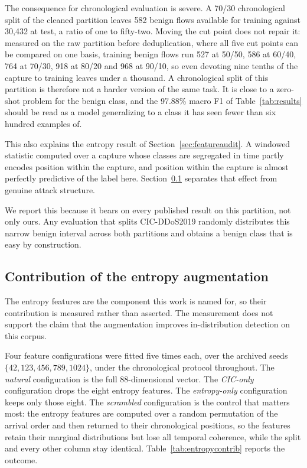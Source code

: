 \documentclass{ieeeaccess}
\begin{document}
The consequence for chronological evaluation is severe. A 70/30 chronological
split of the cleaned partition leaves 582 benign flows available for training
against 30,432 at test, a ratio of one to fifty-two. Moving the cut point does
not repair it: measured on the raw partition before deduplication, where all five
cut points can be compared on one basis, training benign flows run 527 at 50/50,
586 at 60/40, 764 at 70/30, 918 at 80/20 and 968 at 90/10, so even devoting nine
tenths of the capture to training leaves under a thousand. A chronological split of this
partition is therefore not a harder version of the same task. It is close to a
zero-shot problem for the benign class, and the 97.88\% macro F1 of
Table~\ref{tab:results} should be read as a model generalizing to a class it has
seen fewer than six hundred examples of.

This also explains the entropy result of Section~\ref{sec:featureaudit}. A
windowed statistic computed over a capture whose classes are segregated in time
partly encodes position within the capture, and position within the capture is
almost perfectly predictive of the label here. Section~\ref{sec:entropycontrib}
separates that effect from genuine attack structure.

We report this because it bears on every published result on this partition, not
only ours. Any evaluation that splits CIC-DDoS2019 randomly distributes this
narrow benign interval across both partitions and obtains a benign class that is
easy by construction.

\subsection{Contribution of the entropy augmentation}
\label{sec:entropycontrib}
The entropy features are the component this work is named for, so their
contribution is measured rather than asserted. The measurement does not
support the claim that the augmentation improves in-distribution detection on
this corpus.

Four feature configurations were fitted five times each, over the archived seeds
$\{42, 123, 456, 789, 1024\}$, under the chronological protocol throughout. The
\emph{natural} configuration is the full 88-dimensional vector. The
\emph{CIC-only} configuration drops the eight entropy features. The
\emph{entropy-only} configuration keeps only those eight. The \emph{scrambled}
configuration is the control that matters most: the entropy features are
computed over a random permutation of the arrival order and then returned to
their chronological positions, so the features retain their marginal
distributions but lose all temporal coherence, while the split and every other
column stay identical. Table~\ref{tab:entropycontrib} reports the outcome.
\end{document}
